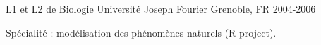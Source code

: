\begin{cventries}
\cventry
  {L1 et L2 de Biologie} %
  {Université Joseph Fourier} %
  {Grenoble, FR} %
  {2004-2006} %
  {
    \begin{cvitems} %
      Spécialité : modélisation des phénomènes naturels (R-project).
    \end{cvitems}
  }

\end{cventries}
